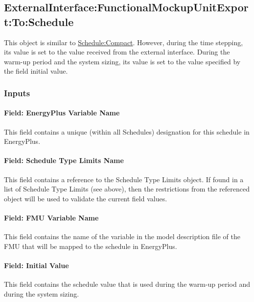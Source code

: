 \subsection{ExternalInterface:FunctionalMockupUnitExport:To:Schedule}\label{externalinterfacefunctionalmockupunitexporttoschedule}

This object is similar to \hyperref[schedulecompact]{Schedule:Compact}. However, during the time stepping, its value is set to the value received from the external interface. During the warm-up period and the system sizing, its value is set to the value specified by the field initial value.

\subsubsection{Inputs}\label{inputs-10-005}

\paragraph{Field: EnergyPlus Variable Name}\label{field-energyplus-variable-name-5}

This field contains a unique (within all Schedules) designation for this schedule in EnergyPlus.

\paragraph{Field: Schedule Type Limits Name}\label{field-schedule-type-limits-name-2}

This field contains a reference to the Schedule Type Limits object. If found in a list of Schedule Type Limits (see above), then the restrictions from the referenced object will be used to validate the current field values.

\paragraph{Field: FMU Variable Name}\label{field-fmu-variable-name-5}

This field contains the name of the variable in the model description file of the FMU that will be mapped to the schedule in EnergyPlus.

\paragraph{Field: Initial Value}\label{field-initial-value-6}

This field contains the schedule value that is used during the warm-up period and during the system sizing.

